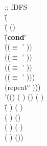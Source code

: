     \begin{ZZZZschemedisplay}%
;; fDFS\\%
\va{$\gt$} \=(  \\%
  \>\PRN \HL \=( ()\\%
  \>  \>\PRN \HL \=(\textbf{cond$^e$}\\%
  \>  \>  \>\PRN \HL \=(($\equiv$ ' ))\\%
  \>  \>  \>  \>(($\equiv$ ' ))\\%
  \>  \>  \>  \>(($\equiv$ ' ))\\%
  \>  \>  \>  \>(($\equiv$ ' )))\\%
  \>  \>  \>(repeat$^o$  )))\\%
'\=(() ( ) () (  )\\%
 \>\PRN \=(   ) ( )\\%
 \> \>(    ) ()\\%
 \> \>(     ) (  )\\%
 \> \>(      ) ())
\end{ZZZZschemedisplay}
	